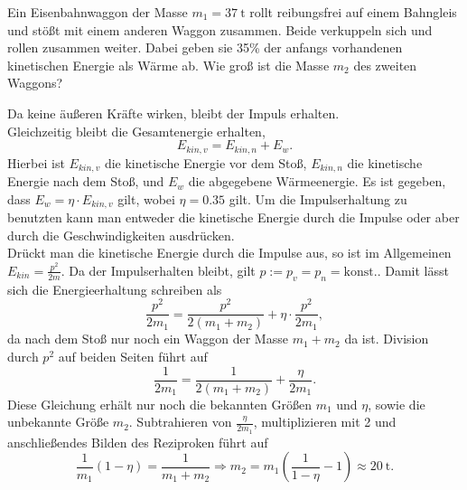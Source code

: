 	\begin{Exercise}[label=ipho201741, title = Eisenbahnwaggon,difficulty={2},origin = {4. Runde IPhO 2017, Kurzaufgabe}]
 Ein Eisenbahnwaggon der Masse $m_1 = 37~\mathrm{t}$ rollt reibungsfrei auf einem Bahngleis und stößt mit einem anderen Waggon zusammen. Beide verkuppeln sich und rollen zusammen weiter. Dabei geben sie 35\% der anfangs vorhandenen kinetischen Energie als Wärme ab. Wie groß ist die Masse $m_2$ des zweiten Waggons?
	\end{Exercise}
\begin{Answer}[ref = ipho201741]
	Da keine äußeren Kräfte wirken, bleibt der Impuls erhalten.\\ Gleichzeitig bleibt die Gesamtenergie erhalten,
	\begin{equation}\label{energycons}
		E_{kin,v} = E_{kin,n}+E_{w}.
	\end{equation}
	Hierbei ist $E_{kin,v}$ die kinetische Energie vor dem Stoß, $E_{kin,n}$ die kinetische Energie nach dem Stoß, und $E_{w}$ die abgegebene Wärmeenergie. Es ist gegeben, dass $E_{w} = \eta \cdot E_{kin,v}$ gilt, wobei $\eta = 0.35$ gilt. Um die Impulserhaltung zu benutzten kann man entweder die kinetische Energie durch die Impulse oder aber durch die Geschwindigkeiten ausdrücken.\\
	Drückt man die kinetische Energie durch die Impulse aus, so ist im Allgemeinen $E_{kin} = \frac{p^2}{2m}$. Da der Impulserhalten bleibt, gilt $p:=p_v = p_n = \mathrm{konst.}$. Damit lässt sich die Energieerhaltung schreiben als
	\begin{equation}\label{penenergycons}
		\frac{p^2}{2m_1}= \frac{p^2}{2\left(m_1+m_2\right)} + \eta\cdot \frac{p^2}{2m_1},
	\end{equation}
	da nach dem Stoß nur noch ein \glqq Waggon\grqq{} der Masse $m_1+m_2$ da ist.
	Division durch $p^2$ auf beiden Seiten führt auf
	\begin{equation}\label{masscond}
		\frac{1}{2m_1}= \frac{1}{2\left(m_1+m_2\right)}+\frac{\eta}{2m_1}.
	\end{equation}
	Diese Gleichung erhält nur noch die bekannten Größen $m_1$ und $\eta$, sowie die unbekannte Größe $m_2$. Subtrahieren von $\frac{\eta}{2m_1}$, multiplizieren mit 2 und anschließendes Bilden des Reziproken führt auf
	\begin{equation*}\label{solp}
	\boxed{
		\frac{1}{m_1}\left(1-\eta\right) = \frac{1}{m_1+m_2} \Rightarrow m_2 = m_1\left(\frac{1}{1-\eta}-1\right)\approx 20~\mathrm{t}.}
	\end{equation*}

\end{Answer}
